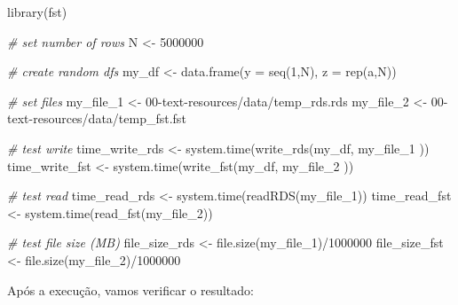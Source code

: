 \documentclass[
  11pt,
]{book}
\newenvironment{Shaded}{\begin{snugshade}}{\end{snugshade}}
\newcommand{\AttributeTok}[1]{\textcolor[rgb]{0.61,0.61,0.61}{#1}}
\newcommand{\CommentTok}[1]{\textcolor[rgb]{0.37,0.37,0.37}{\textit{#1}}}
\newcommand{\DecValTok}[1]{\textcolor[rgb]{0.06,0.06,0.06}{#1}}
\newcommand{\FunctionTok}[1]{\textcolor[rgb]{0,0,0}{#1}}
\newcommand{\NormalTok}[1]{#1}
\newcommand{\OtherTok}[1]{\textcolor[rgb]{0.37,0.37,0.37}{#1}}
\newcommand{\SpecialCharTok}[1]{\textcolor[rgb]{0,0,0}{#1}}
\newcommand{\StringTok}[1]{\textcolor[rgb]{0.5,0.5,0.5}{#1}}
\begin{document}
\begin{Shaded}
\begin{Highlighting}[]
\FunctionTok{library}\NormalTok{(fst)}

\CommentTok{\# set number of rows}
\NormalTok{N }\OtherTok{\textless{}{-}} \DecValTok{5000000}

\CommentTok{\# create random dfs}
\NormalTok{my\_df }\OtherTok{\textless{}{-}} \FunctionTok{data.frame}\NormalTok{(}\AttributeTok{y =} \FunctionTok{seq}\NormalTok{(}\DecValTok{1}\NormalTok{,N),}
                    \AttributeTok{z =} \FunctionTok{rep}\NormalTok{(}\StringTok{\textquotesingle{}a\textquotesingle{}}\NormalTok{,N))}

\CommentTok{\# set files}
\NormalTok{my\_file\_1 }\OtherTok{\textless{}{-}} \StringTok{\textquotesingle{}00{-}text{-}resources/data/temp\_rds.rds\textquotesingle{}}
\NormalTok{my\_file\_2 }\OtherTok{\textless{}{-}} \StringTok{\textquotesingle{}00{-}text{-}resources/data/temp\_fst.fst\textquotesingle{}}

\CommentTok{\# test write}
\NormalTok{time\_write\_rds }\OtherTok{\textless{}{-}} \FunctionTok{system.time}\NormalTok{(}\FunctionTok{write\_rds}\NormalTok{(my\_df, my\_file\_1 ))}
\NormalTok{time\_write\_fst }\OtherTok{\textless{}{-}} \FunctionTok{system.time}\NormalTok{(}\FunctionTok{write\_fst}\NormalTok{(my\_df, my\_file\_2 ))}

\CommentTok{\# test read}
\NormalTok{time\_read\_rds }\OtherTok{\textless{}{-}} \FunctionTok{system.time}\NormalTok{(}\FunctionTok{readRDS}\NormalTok{(my\_file\_1))}
\NormalTok{time\_read\_fst }\OtherTok{\textless{}{-}} \FunctionTok{system.time}\NormalTok{(}\FunctionTok{read\_fst}\NormalTok{(my\_file\_2))}

\CommentTok{\# test file size (MB)}
\NormalTok{file\_size\_rds }\OtherTok{\textless{}{-}} \FunctionTok{file.size}\NormalTok{(my\_file\_1)}\SpecialCharTok{/}\DecValTok{1000000}
\NormalTok{file\_size\_fst }\OtherTok{\textless{}{-}} \FunctionTok{file.size}\NormalTok{(my\_file\_2)}\SpecialCharTok{/}\DecValTok{1000000}
\end{Highlighting}
\end{Shaded}

Após a execução, vamos verificar o resultado:
\end{document}
